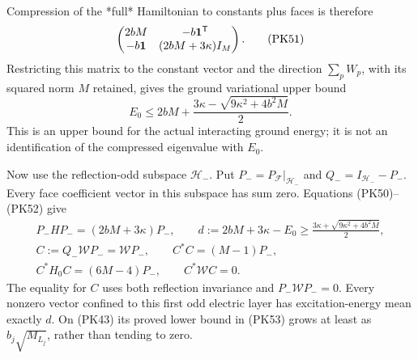 \documentclass[11pt]{article}
\begin{document}
Compression of the *full* Hamiltonian to constants plus faces is therefore
\[
 \begin{pmatrix}
 2bM&-b{\bf1}^{\mathsf T}\\
 -b{\bf1}&(2bM+3\kappa)I_M
 \end{pmatrix}.
 \tag{PK51}
\]
Restricting this matrix to the constant vector and the direction
\(\sum_pW_p\), with its squared norm \(M\) retained, gives the ground
variational upper bound
\[
 E_0\le2bM+\frac{3\kappa-\sqrt{9\kappa^2+4b^2M}}2.
 \tag{PK52}
\]
This is an upper bound for the actual interacting ground energy; it is
not an identification of the compressed eigenvalue with \(E_0\).

Now use the reflection-odd subspace \(\mathcal H_-\). Put
\(P_-=P_{\mathcal F}|_{\mathcal H_-}\) and
\(Q_-=I_{\mathcal H_-}-P_-\). Every face coefficient vector in this
subspace has sum zero. Equations (PK50)–(PK52) give
\[
 \begin{gathered}
 P_-HP_-=(2bM+3\kappa)P_-,\qquad
 d:=2bM+3\kappa-E_0
 \ge\frac{3\kappa+\sqrt{9\kappa^2+4b^2M}}2,\\
 C:=Q_-\mathcal WP_-=\mathcal WP_-,\qquad
 C^*C=(M-1)P_-,\\
 C^*H_0C=(6M-4)P_-,\qquad C^*\mathcal WC=0.
 \end{gathered}\tag{PK53}
\]
The equality for \(C\) uses both reflection invariance and
\(P_-\mathcal WP_-=0\). Every nonzero vector confined to this first
odd electric layer has excitation-energy mean exactly \(d\). On
(PK43) its proved lower bound in (PK53) grows at least as
\(b_j\sqrt{M_{L_j}}\), rather than tending to zero.
\end{document}
